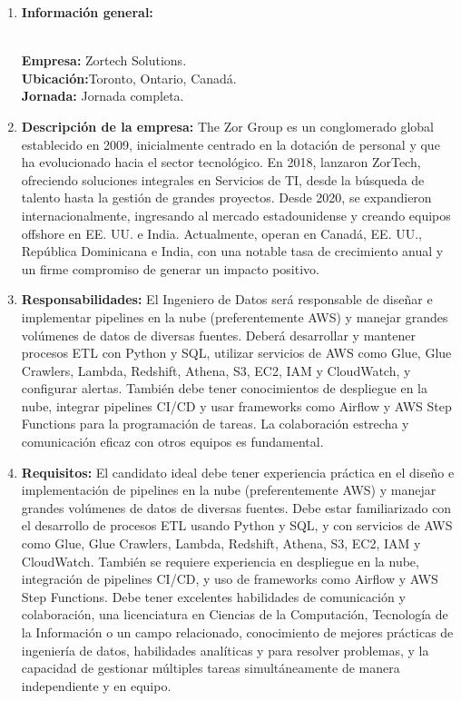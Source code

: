 \documentclass[12pt]{article}
\begin{document}
                \begin{enumerate}
                    \item \textbf{Información general:}
                    
                        \textbf{\\Empresa:} Zortech Solutions.
                        \textbf{\\Ubicación:}Toronto, Ontario, Canadá.
                        \textbf{\\Jornada:} Jornada completa.

                    \item \textbf{Descripción de la empresa:}
                        The Zor Group es un conglomerado global establecido en 2009, inicialmente centrado en la dotación de personal y que ha evolucionado hacia el sector tecnológico. En 2018, lanzaron ZorTech, ofreciendo soluciones integrales en Servicios de TI, desde la búsqueda de talento hasta la gestión de grandes proyectos. Desde 2020, se expandieron internacionalmente, ingresando al mercado estadounidense y creando equipos offshore en EE. UU. e India. Actualmente, operan en Canadá, EE. UU., República Dominicana e India, con una notable tasa de crecimiento anual y un firme compromiso de generar un impacto positivo.

                    \item \textbf{Responsabilidades:}
                        El Ingeniero de Datos será responsable de diseñar e implementar pipelines en la nube (preferentemente AWS) y manejar grandes volúmenes de datos de diversas fuentes. Deberá desarrollar y mantener procesos ETL con Python y SQL, utilizar servicios de AWS como Glue, Glue Crawlers, Lambda, Redshift, Athena, S3, EC2, IAM y CloudWatch, y configurar alertas. También debe tener conocimientos de despliegue en la nube, integrar pipelines CI/CD y usar frameworks como Airflow y AWS Step Functions para la programación de tareas. La colaboración estrecha y comunicación eficaz con otros equipos es fundamental.

                    \item \textbf{Requisitos:}
                        El candidato ideal debe tener experiencia práctica en el diseño e implementación de pipelines en la nube (preferentemente AWS) y manejar grandes volúmenes de datos de diversas fuentes. Debe estar familiarizado con el desarrollo de procesos ETL usando Python y SQL, y con servicios de AWS como Glue, Glue Crawlers, Lambda, Redshift, Athena, S3, EC2, IAM y CloudWatch. También se requiere experiencia en despliegue en la nube, integración de pipelines CI/CD, y uso de frameworks como Airflow y AWS Step Functions. Debe tener excelentes habilidades de comunicación y colaboración, una licenciatura en Ciencias de la Computación, Tecnología de la Información o un campo relacionado, conocimiento de mejores prácticas de ingeniería de datos, habilidades analíticas y para resolver problemas, y la capacidad de gestionar múltiples tareas simultáneamente de manera independiente y en equipo.

                \end{enumerate}
\end{document}
